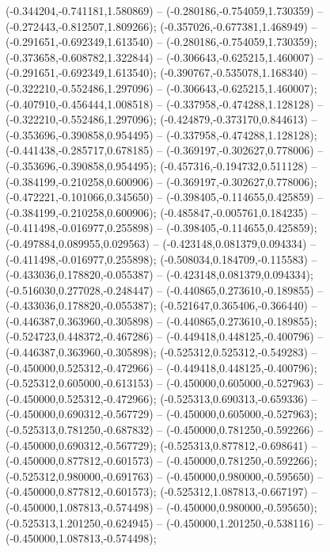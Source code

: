  (-0.344204,-0.741181,1.580869) -- (-0.280186,-0.754059,1.730359) -- (-0.272443,-0.812507,1.809266);
 (-0.357026,-0.677381,1.468949) -- (-0.291651,-0.692349,1.613540) -- (-0.280186,-0.754059,1.730359);
 (-0.373658,-0.608782,1.322844) -- (-0.306643,-0.625215,1.460007) -- (-0.291651,-0.692349,1.613540);
 (-0.390767,-0.535078,1.168340) -- (-0.322210,-0.552486,1.297096) -- (-0.306643,-0.625215,1.460007);
 (-0.407910,-0.456444,1.008518) -- (-0.337958,-0.474288,1.128128) -- (-0.322210,-0.552486,1.297096);
 (-0.424879,-0.373170,0.844613) -- (-0.353696,-0.390858,0.954495) -- (-0.337958,-0.474288,1.128128);
 (-0.441438,-0.285717,0.678185) -- (-0.369197,-0.302627,0.778006) -- (-0.353696,-0.390858,0.954495);
 (-0.457316,-0.194732,0.511128) -- (-0.384199,-0.210258,0.600906) -- (-0.369197,-0.302627,0.778006);
 (-0.472221,-0.101066,0.345650) -- (-0.398405,-0.114655,0.425859) -- (-0.384199,-0.210258,0.600906);
 (-0.485847,-0.005761,0.184235) -- (-0.411498,-0.016977,0.255898) -- (-0.398405,-0.114655,0.425859);
 (-0.497884,0.089955,0.029563) -- (-0.423148,0.081379,0.094334) -- (-0.411498,-0.016977,0.255898);
 (-0.508034,0.184709,-0.115583) -- (-0.433036,0.178820,-0.055387) -- (-0.423148,0.081379,0.094334);
 (-0.516030,0.277028,-0.248447) -- (-0.440865,0.273610,-0.189855) -- (-0.433036,0.178820,-0.055387);
 (-0.521647,0.365406,-0.366440) -- (-0.446387,0.363960,-0.305898) -- (-0.440865,0.273610,-0.189855);
 (-0.524723,0.448372,-0.467286) -- (-0.449418,0.448125,-0.400796) -- (-0.446387,0.363960,-0.305898);
 (-0.525312,0.525312,-0.549283) -- (-0.450000,0.525312,-0.472966) -- (-0.449418,0.448125,-0.400796);
 (-0.525312,0.605000,-0.613153) -- (-0.450000,0.605000,-0.527963) -- (-0.450000,0.525312,-0.472966);
 (-0.525313,0.690313,-0.659336) -- (-0.450000,0.690312,-0.567729) -- (-0.450000,0.605000,-0.527963);
 (-0.525313,0.781250,-0.687832) -- (-0.450000,0.781250,-0.592266) -- (-0.450000,0.690312,-0.567729);
 (-0.525313,0.877812,-0.698641) -- (-0.450000,0.877812,-0.601573) -- (-0.450000,0.781250,-0.592266);
 (-0.525312,0.980000,-0.691763) -- (-0.450000,0.980000,-0.595650) -- (-0.450000,0.877812,-0.601573);
 (-0.525312,1.087813,-0.667197) -- (-0.450000,1.087813,-0.574498) -- (-0.450000,0.980000,-0.595650);
 (-0.525313,1.201250,-0.624945) -- (-0.450000,1.201250,-0.538116) -- (-0.450000,1.087813,-0.574498);
